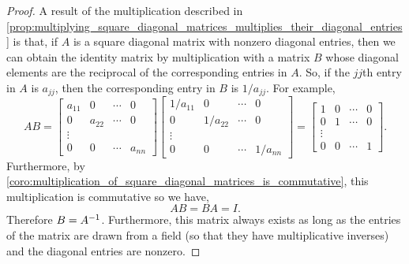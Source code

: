 \documentclass[../MathsNotesBase.tex]{subfiles}
\begin{document}
{\begin{corollary}
		\end{corollary}
		\begin{proof}
			A result of the multiplication described in \autoref{prop:multiplying_square_diagonal_matrices_multiplies_their_diagonal_entries} is that, if $A$ is a square diagonal matrix with nonzero diagonal entries, then we can obtain the identity matrix by multiplication with a matrix $B$ whose diagonal elements are the reciprocal of the corresponding entries in $A$. So, if the $jj$th entry in $A$ is $a_{jj}$, then the corresponding entry in $B$ is $1/a_{jj}$. For example,
			\[ 	AB = 
				\begin{bmatrix}
				a_{11} & 0      & \cdots & 0\\
				0 	   & a_{22} & \cdots & 0\\
				\vdots\\
				0 	   & 0 	    & \cdots & a_{nn}
				\end{bmatrix}
				\begin{bmatrix}
				1/a_{11} & 0        & \cdots & 0\\
				0 	     & 1/a_{22} & \cdots & 0\\
				\vdots\\
				0 	     & 0 	    & \cdots & 1/a_{nn}
				\end{bmatrix} =
				\begin{bmatrix}
				1 & 0 & \cdots & 0\\
				0 & 1 & \cdots & 0\\
				\vdots\\
				0 & 0 & \cdots & 1
				\end{bmatrix}.
			\]
			Furthermore, by \ref{coro:multiplication_of_square_diagonal_matrices_is_commutative}, this multiplication is commutative so we have,
			\[ AB = BA = I. \]
			Therefore ${ B = {A}^{-1} }$. Furthermore, this matrix always exists as long as the entries of the matrix are drawn from a field (so that they have multiplicative inverses) and the diagonal entries are nonzero.
		\end{proof}
		
}
\end{document}
